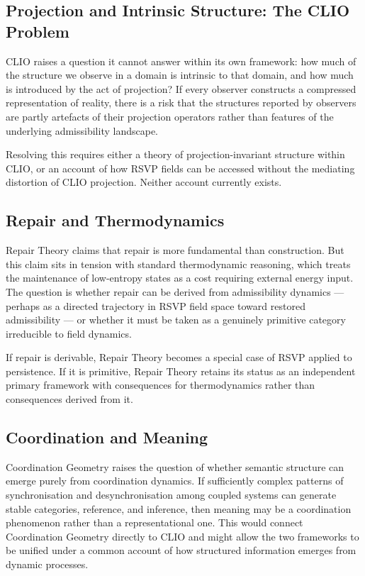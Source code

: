 \documentclass[12pt, twoside]{article}
\begin{document}
\subsection{Projection and Intrinsic Structure: The CLIO Problem}

CLIO raises a question it cannot answer within its own framework: how much of
the structure we observe in a domain is intrinsic to that domain, and how
much is introduced by the act of projection? If every observer constructs a
compressed representation of reality, there is a risk that the structures
reported by observers are partly artefacts of their projection operators
rather than features of the underlying admissibility landscape.

Resolving this requires either a theory of projection-invariant structure
within CLIO, or an account of how RSVP fields can be accessed without the
mediating distortion of CLIO projection. Neither account currently exists.

\subsection{Repair and Thermodynamics}

Repair Theory claims that repair is more fundamental than construction. But
this claim sits in tension with standard thermodynamic reasoning, which
treats the maintenance of low-entropy states as a cost requiring external
energy input. The question is whether repair can be derived from admissibility
dynamics — perhaps as a directed trajectory in RSVP field space toward
restored admissibility — or whether it must be taken as a genuinely primitive
category irreducible to field dynamics.

If repair is derivable, Repair Theory becomes a special case of RSVP applied
to persistence. If it is primitive, Repair Theory retains its status as an
independent primary framework with consequences for thermodynamics rather than
consequences derived from it.

\subsection{Coordination and Meaning}

Coordination Geometry raises the question of whether semantic structure can
emerge purely from coordination dynamics. If sufficiently complex patterns of
synchronisation and desynchronisation among coupled systems can generate
stable categories, reference, and inference, then meaning may be a
coordination phenomenon rather than a representational one. This would
connect Coordination Geometry directly to CLIO and might allow the two
frameworks to be unified under a common account of how structured information
emerges from dynamic processes.
\end{document}
